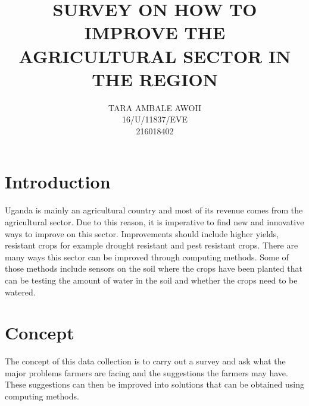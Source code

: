 \documentclass[10pt,a4paper]{report}
\begin{document}
	
	\author{TARA AMBALE AWOII\\
			16/U/11837/EVE\\
			216018402}
	\title{SURVEY ON HOW TO IMPROVE THE AGRICULTURAL SECTOR IN THE REGION}
	\maketitle
	
	\begin{flushleft}
		\section{Introduction}
			Uganda is mainly an agricultural country and most of its revenue comes from the agricultural sector. Due to this reason, it is imperative to find new and innovative ways to improve on this sector. Improvements should include higher yields, resistant crops for example drought resistant and pest resistant crops. 
			\linebreak
			\linebreak
			There are many ways this sector can be improved through computing methods. Some of those methods include sensors on the soil where the crops have been planted that can be testing the amount of water in the soil and whether the crops need to be watered.
			\linebreak
			\linebreak
			\section{Concept}
			The concept of this data collection is to carry out a survey and ask what the major problems farmers are facing and the suggestions the farmers may have. These suggestions can then be improved into solutions that can be obtained using computing methods.
			
	\end{flushleft}
\end{document}
